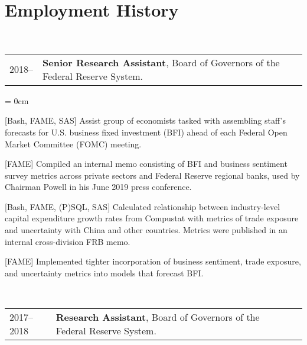 \documentclass[a4paper, 11pt]{article}
\begin{document}
  \section{Employment History}
    ~\begin{tabular}{llP{15cm}}
      2018-- & \textbf{Senior Research Assistant}, Board of Governors of the Federal Reserve System.
    \end{tabular}

    \begin{compactitem}\parskip = 0cm
      \item {[Bash, FAME, SAS]} Assist group of economists tasked with assembling staff's forecasts for U.S. business fixed investment (BFI) ahead of each Federal Open Market Committee (FOMC) meeting.
      \item {[FAME]} Compiled an internal memo consisting of BFI and business sentiment survey metrics across private sectors and Federal Reserve regional banks, used by Chairman Powell in his June 2019 press conference.
      \item {[Bash, FAME, (P)SQL, SAS]} Calculated relationship between industry-level capital expenditure growth rates from Compustat with metrics of trade exposure and uncertainty with China and other countries. Metrics were published in an internal cross-division FRB memo.
      \item {[FAME]} Implemented tighter incorporation of business sentiment, trade exposure, and uncertainty metrics into models that forecast BFI.
    \end{compactitem}

    \vspace*{1em}

    ~\begin{tabular}{llP{15cm}}
      2017--2018 & \textbf{Research Assistant}, Board of Governors of the Federal Reserve System.
    \end{tabular}
\end{document}
